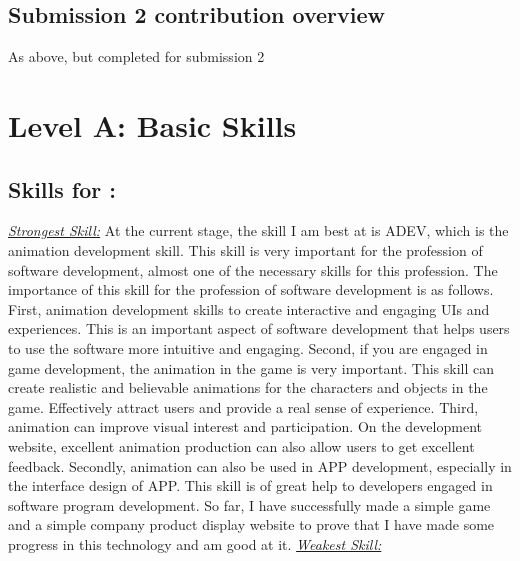 \documentclass[a4paper, 11pt]{report}
\begin{document}
\subsection{Submission 2 contribution overview}

As above, but completed for submission 2




\newpage
\section{Level A: Basic Skills}

\subsection{Skills for \majC: \studA}
\underline{\emph{Strongest Skill:}}\newline
At the current stage, the skill I am best at is ADEV\cite{SFIA}, which is the animation development skill. This skill is very important for the profession of software development, almost one of the necessary skills for this profession. The importance of this skill for the profession of software development is as follows. First, animation development skills to create interactive and engaging UIs and experiences. This is an important aspect of software development that helps users to use the software more intuitive and engaging. Second, if you are engaged in game development, the animation in the game is very important. This skill can create realistic and believable animations for the characters and objects in the game. Effectively attract users and provide a real sense of experience. Third, animation can improve visual interest and participation. On the development website, excellent animation production can also allow users to get excellent feedback. Secondly, animation can also be used in APP development, especially in the interface design of APP. This skill is of great help to developers engaged in software program development. So far, I have successfully made a simple game and a simple company product display website to prove that I have made some progress in this technology and am good at it.
\newline\newline
\underline{\emph{Weakest Skill:}}\newline
\end{document}
